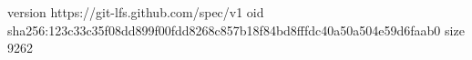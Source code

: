 version https://git-lfs.github.com/spec/v1
oid sha256:123c33c35f08dd899f00fdd8268c857b18f84bd8fffdc40a50a504e59d6faab0
size 9262
